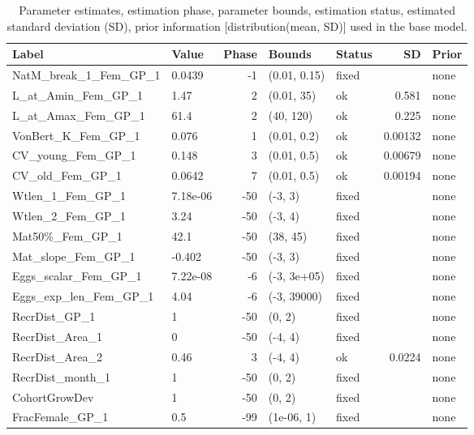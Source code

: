 \documentclass[
]{scrartcl}
\begin{document}
\begin{landscape}

\begingroup
\fontsize{9.0pt}{10.8pt}\selectfont

\begin{longtable}{llrllrl}

\caption{\label{tbl-pars}Parameter estimates, estimation phase,
parameter bounds, estimation status, estimated standard deviation (SD),
prior information {[}distribution(mean, SD){]} used in the base model.}

\tabularnewline

\toprule
Label & Value & Phase & Bounds & Status & SD & Prior \\ 
\midrule\addlinespace[2.5pt]
NatM\_break\_1\_Fem\_GP\_1 & 0.0439 & -1 & (0.01, 0.15) & fixed &  & none \\ 
L\_at\_Amin\_Fem\_GP\_1 & 1.47 & 2 & (0.01, 35) & ok & 0.581 & none \\ 
L\_at\_Amax\_Fem\_GP\_1 & 61.4 & 2 & (40, 120) & ok & 0.225 & none \\ 
VonBert\_K\_Fem\_GP\_1 & 0.076 & 1 & (0.01, 0.2) & ok & 0.00132 & none \\ 
CV\_young\_Fem\_GP\_1 & 0.148 & 3 & (0.01, 0.5) & ok & 0.00679 & none \\ 
CV\_old\_Fem\_GP\_1 & 0.0642 & 7 & (0.01, 0.5) & ok & 0.00194 & none \\ 
Wtlen\_1\_Fem\_GP\_1 & 7.18e-06 & -50 & (-3, 3) & fixed &  & none \\ 
Wtlen\_2\_Fem\_GP\_1 & 3.24 & -50 & (-3, 4) & fixed &  & none \\ 
Mat50\%\_Fem\_GP\_1 & 42.1 & -50 & (38, 45) & fixed &  & none \\ 
Mat\_slope\_Fem\_GP\_1 & -0.402 & -50 & (-3, 3) & fixed &  & none \\ 
Eggs\_scalar\_Fem\_GP\_1 & 7.22e-08 & -6 & (-3, 3e+05) & fixed &  & none \\ 
Eggs\_exp\_len\_Fem\_GP\_1 & 4.04 & -6 & (-3, 39000) & fixed &  & none \\ 
RecrDist\_GP\_1 & 1 & -50 & (0, 2) & fixed &  & none \\ 
RecrDist\_Area\_1 & 0 & -50 & (-4, 4) & fixed &  & none \\ 
RecrDist\_Area\_2 & 0.46 & 3 & (-4, 4) & ok & 0.0224 & none \\ 
RecrDist\_month\_1 & 1 & -50 & (0, 2) & fixed &  & none \\ 
CohortGrowDev & 1 & -50 & (0, 2) & fixed &  & none \\ 
FracFemale\_GP\_1 & 0.5 & -99 & (1e-06, 1) & fixed &  & none \\ 

\end{longtable}
\end{landscape}
\end{document}
